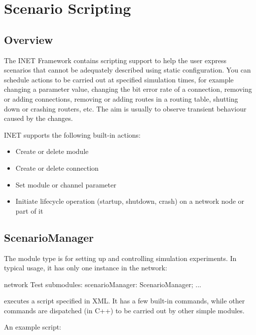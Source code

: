 \chapter{Scenario Scripting}
\label{cha:scenario-scripting}

\section{Overview}

The INET Framework contains scripting support to help the user express 
scenarios that cannot be adequately described using static configuration.
You can schedule actions to be carried out at specified simulation times,
for example changing a parameter value, changing the bit error rate of
a connection, removing or adding connections, removing or adding 
routes in a routing table, shutting down or crashing routers, etc. 
The aim is usually to observe transient behaviour caused by the changes.

INET supports the following built-in actions:

\begin{itemize}
  \item Create or delete module
  \item Create or delete connection
  \item Set module or channel parameter
  \item Initiate lifecycle operation (startup, shutdown, crash) 
    on a network node or part of it
\end{itemize}

\section{ScenarioManager}

The  module type is for setting up and controlling
simulation experiments. In typical usage, it has only one instance in the
network:

\begin{ned}
network Test {
    submodules:
        scenarioManager: ScenarioManager;
        ...
}
\end{ned}

 executes a script specified in XML. It has a few
built-in commands, while other commands are dispatched (in C++) to be 
carried out by other simple modules.

An example script:

